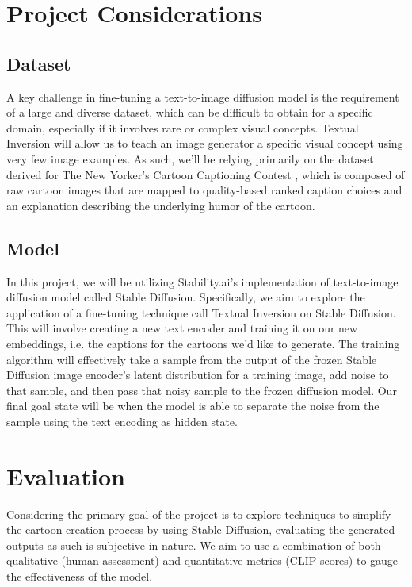 \documentclass[letterpaper]{article} %
\begin{document}
\section{Project Considerations}

\subsection{Dataset}
A key challenge in fine-tuning a text-to-image diffusion model is the requirement of a large and diverse dataset, which can be difficult to obtain for a specific domain, especially if it involves rare or complex visual concepts. Textual Inversion will allow us to teach an image generator a specific visual concept using very few image examples. As such, we’ll be relying primarily on the dataset derived for The New Yorker’s Cartoon Captioning Contest \cite{hessel2022androids}, which is composed of raw cartoon images that are mapped to quality-based ranked caption choices and an explanation describing the underlying humor of the cartoon.

\subsection{Model}

In this project, we will be utilizing Stability.ai’s implementation of text-to-image diffusion model called Stable Diffusion. Specifically, we aim to explore the application of a fine-tuning technique call Textual Inversion on Stable Diffusion. This will involve creating a new text encoder and training it on our new embeddings, i.e. the captions for the cartoons we’d like to generate. The training algorithm will effectively take a sample from the output of the frozen Stable Diffusion image encoder’s latent distribution for a training image, add noise to that sample, and then pass that noisy sample to the frozen diffusion model. Our final goal state will be when the model is able to separate the noise from the sample using the text encoding as hidden state.



\section{Evaluation}

Considering the primary goal of the project is to explore techniques to simplify the cartoon creation process by using Stable Diffusion, evaluating the generated outputs as such is subjective in nature. We aim to use a combination of both qualitative (human assessment) and quantitative metrics (CLIP scores) to gauge the effectiveness of the model.


\end{document}
